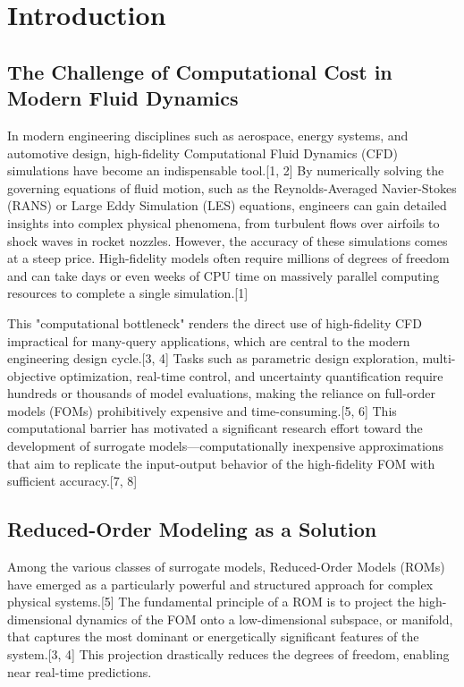 \documentclass[12pt, a4paper]{report}
\begin{document}
\chapter{Introduction}

\section{The Challenge of Computational Cost in Modern Fluid Dynamics}
In modern engineering disciplines such as aerospace, energy systems, and automotive design, high-fidelity Computational Fluid Dynamics (CFD) simulations have become an indispensable tool.[1, 2] By numerically solving the governing equations of fluid motion, such as the Reynolds-Averaged Navier-Stokes (RANS) or Large Eddy Simulation (LES) equations, engineers can gain detailed insights into complex physical phenomena, from turbulent flows over airfoils to shock waves in rocket nozzles. However, the accuracy of these simulations comes at a steep price. High-fidelity models often require millions of degrees of freedom and can take days or even weeks of CPU time on massively parallel computing resources to complete a single simulation.[1]

This "computational bottleneck" renders the direct use of high-fidelity CFD impractical for many-query applications, which are central to the modern engineering design cycle.[3, 4] Tasks such as parametric design exploration, multi-objective optimization, real-time control, and uncertainty quantification require hundreds or thousands of model evaluations, making the reliance on full-order models (FOMs) prohibitively expensive and time-consuming.[5, 6] This computational barrier has motivated a significant research effort toward the development of surrogate models—computationally inexpensive approximations that aim to replicate the input-output behavior of the high-fidelity FOM with sufficient accuracy.[7, 8]

\section{Reduced-Order Modeling as a Solution}
Among the various classes of surrogate models, Reduced-Order Models (ROMs) have emerged as a particularly powerful and structured approach for complex physical systems.[5] The fundamental principle of a ROM is to project the high-dimensional dynamics of the FOM onto a low-dimensional subspace, or manifold, that captures the most dominant or energetically significant features of the system.[3, 4] This projection drastically reduces the degrees of freedom, enabling near real-time predictions.
\end{document}
